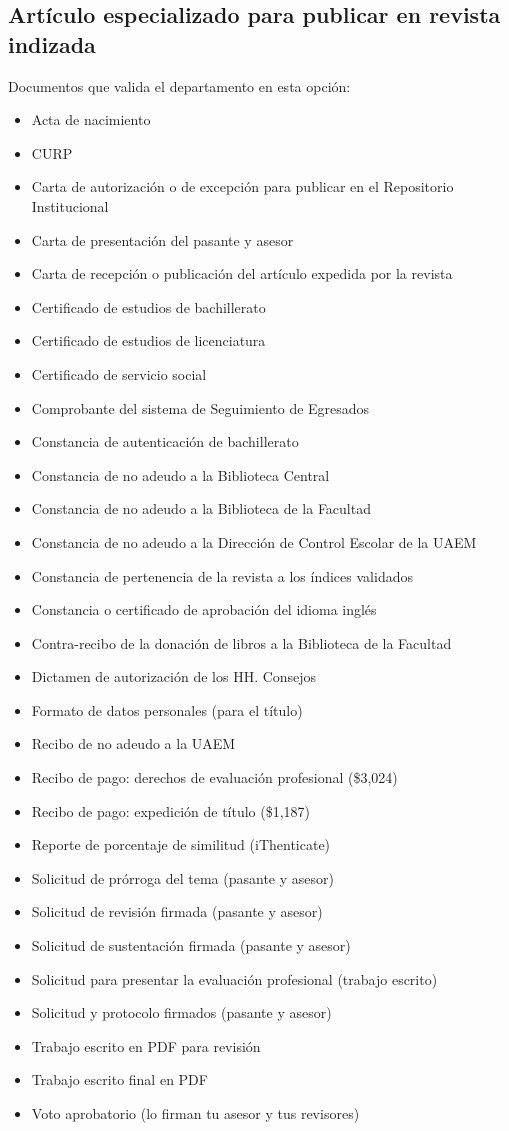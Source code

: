 \subsection{Artículo especializado para publicar en revista indizada}
Documentos que valida el departamento en esta opción:
\begin{itemize}
  \item Acta de nacimiento
  \item CURP
  \item Carta de autorización o de excepción para publicar en el Repositorio Institucional
  \item Carta de presentación del pasante y asesor
  \item Carta de recepción o publicación del artículo expedida por la revista
  \item Certificado de estudios de bachillerato
  \item Certificado de estudios de licenciatura
  \item Certificado de servicio social
  \item Comprobante del sistema de Seguimiento de Egresados
  \item Constancia de autenticación de bachillerato
  \item Constancia de no adeudo a la Biblioteca Central
  \item Constancia de no adeudo a la Biblioteca de la Facultad
  \item Constancia de no adeudo a la Dirección de Control Escolar de la UAEM
  \item Constancia de pertenencia de la revista a los índices validados
  \item Constancia o certificado de aprobación del idioma inglés
  \item Contra-recibo de la donación de libros a la Biblioteca de la Facultad
  \item Dictamen de autorización de los HH. Consejos
  \item Formato de datos personales (para el título)
  \item Recibo de no adeudo a la UAEM
  \item Recibo de pago: derechos de evaluación profesional (\$3,024)
  \item Recibo de pago: expedición de título (\$1,187)
  \item Reporte de porcentaje de similitud (iThenticate)
  \item Solicitud de prórroga del tema (pasante y asesor)
  \item Solicitud de revisión firmada (pasante y asesor)
  \item Solicitud de sustentación firmada (pasante y asesor)
  \item Solicitud para presentar la evaluación profesional (trabajo escrito)
  \item Solicitud y protocolo firmados (pasante y asesor)
  \item Trabajo escrito en PDF para revisión
  \item Trabajo escrito final en PDF
  \item Voto aprobatorio (lo firman tu asesor y tus revisores)
\end{itemize}
